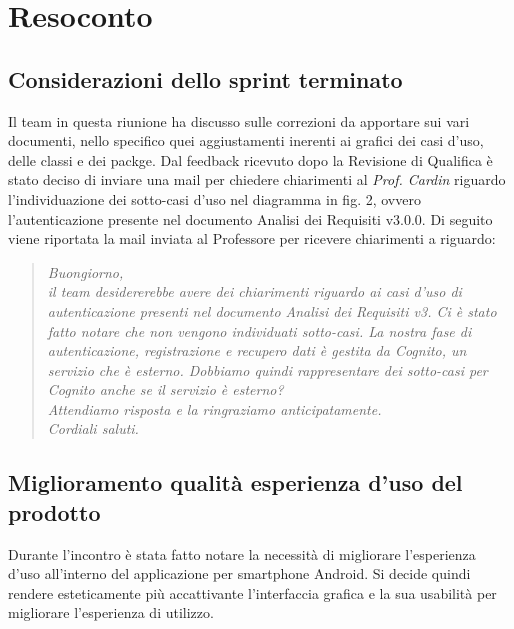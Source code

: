\clearpage
\section{Resoconto}
	\subsection{Considerazioni dello sprint terminato}
	\label{sec:considerazioni}
	Il team in questa riunione ha discusso sulle correzioni da apportare sui vari documenti, nello specifico quei aggiustamenti inerenti ai grafici dei casi d'uso, delle classi e dei packge. Dal feedback ricevuto dopo la Revisione di Qualifica è stato deciso di inviare una mail per chiedere chiarimenti al \textit{Prof. Cardin} riguardo l'individuazione dei sotto-casi d'uso nel diagramma in fig. 2, ovvero l'autenticazione presente nel documento Analisi dei Requisiti v3.0.0. Di seguito viene riportata la mail inviata al Professore per ricevere chiarimenti a riguardo:
	\begin{quote}
		\emph{Buongiorno,\\[0.25cm]il team desidererebbe avere dei chiarimenti riguardo ai casi d’uso di autenticazione presenti nel documento Analisi dei Requisiti v3. Ci è stato fatto notare che non vengono individuati sotto-casi. La nostra fase di autenticazione, registrazione e recupero dati è gestita da Cognito, un servizio che è esterno. Dobbiamo quindi rappresentare dei sotto-casi per Cognito anche se il servizio è esterno?\\[0.25cm]Attendiamo risposta e la ringraziamo anticipatamente.\\Cordiali saluti.
		}
	\end{quote}
	\subsection{Miglioramento qualità esperienza d'uso del prodotto}
	\label{sec:migliorie}
	Durante l'incontro è stata fatto notare la necessità di migliorare l'esperienza d'uso all'interno del applicazione per smartphone Android. Si decide quindi rendere esteticamente più accattivante l'interfaccia grafica e la sua usabilità per migliorare l'esperienza di utilizzo. 

	
	
	